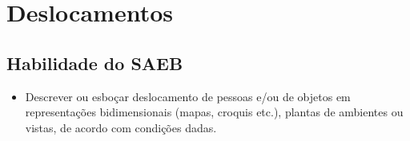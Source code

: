 
\chapter{Deslocamentos}

\vspace*{-1cm}

\section*{Habilidade do SAEB}
\begin{itemize}
\item Descrever ou esboçar deslocamento de pessoas e/ou
de objetos em representações bidimensionais (mapas, croquis etc.),
plantas de ambientes ou vistas, de acordo com condições dadas.
\end{itemize}

